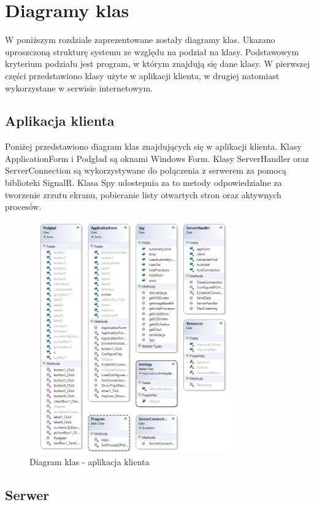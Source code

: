\section{Diagramy klas}

W poniższym rozdziale zaprezentowane zostały diagramy klas. Ukazano uproszczoną strukturę systemu ze względu na podział na klasy. Podstawowym kryterium podziału jest program, w którym znajdują się dane klasy. W pierwszej części przedstawiono klasy użyte w aplikacji klienta, w drugiej natomiast wykorzystane w serwisie internetowym.

\subsection {Aplikacja klienta}
Poniżej przedstawiono diagram klas znajdujących się w aplikacji klienta. Klasy ApplicationForm i Podglad są oknami Windows Form. Klasy ServerHandler oraz ServerConnection są wykorzystywane do połączenia z serwerem za pomocą biblioteki SignalR. Klasa Spy udostepnia za to metody odpowiedzialne za tworzenie zrzutu ekranu, pobieranie listy otwartych stron oraz aktywnych procesów.

\begin{figure} [!ht]
    \centering
    \includegraphics[height=10cm,width=9cm]{diagramklas_klient}
    \caption{Diagram klas - aplikacja klienta}
    \label{fig:my_label}
\end{figure}

\subsection{Serwer}

